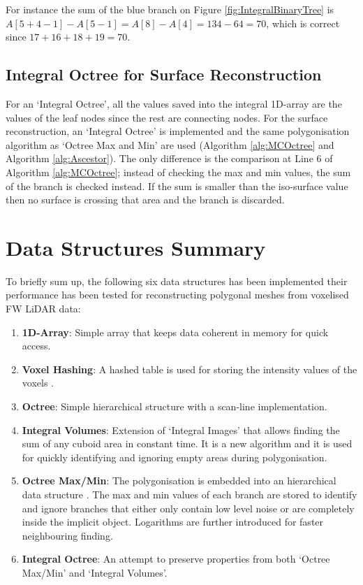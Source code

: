 \documentclass{subfiles}
\begin{document}
\par For instance the sum of the blue branch on Figure \ref{fig:IntegralBinaryTree} is $A[5+4-1]-A[5-1] = A[8]-A[4] = 134-64 = 70$, which is correct since $17+16+18+19=70$.




\subsection{Integral Octree for Surface Reconstruction}

\par For an `Integral Octree', all the values saved into the integral 1D-array are the values of the leaf nodes since the rest are connecting nodes. For the surface reconstruction, an `Integral Octree' is implemented and the same polygonisation algorithm as `Octree Max and Min' are used (Algorithm \ref{alg:MCOctree} and Algorithm \ref{alg:Ascestor}). The only difference is the comparison at Line 6 of Algorithm \ref{alg:MCOctree}; instead of checking the max and min values, the sum of the branch is checked instead. If the sum is smaller than the iso-surface value then no surface is crossing that area and the branch is discarded. 



\section{Data Structures Summary}

\par To briefly sum up, the following six data structures has been implemented their performance has been tested for reconstructing polygonal meshes from voxelised FW LiDAR data:

\begin{enumerate}
	\item \textbf{1D-Array}: Simple array that keeps data coherent in memory for quick access.
	\item \textbf{Voxel Hashing}: A hashed table is used for storing the intensity values of the voxels \cite{Nievner2016voxelHashing}.
	\item \textbf{Octree}: Simple hierarchical structure with a scan-line implementation.
	\item \textbf{Integral Volumes}: Extension of `Integral Images' that allows finding the sum of any cuboid area in constant time. It is a new algorithm and it is used for quickly identifying and ignoring empty areas during polygonisation.
	\item \textbf{Octree Max/Min}: The polygonisation is embedded into an hierarchical data structure \cite{Wilhelms1990}. The max and min values of each branch are stored to identify and ignore branches that either only contain low level noise or are completely inside the implicit object. Logarithms are further introduced for faster neighbouring finding. 
	\item \textbf{Integral Octree}: An attempt to preserve properties from both `Octree Max/Min' and `Integral Volumes'. 
\end{enumerate}
\end{document}
